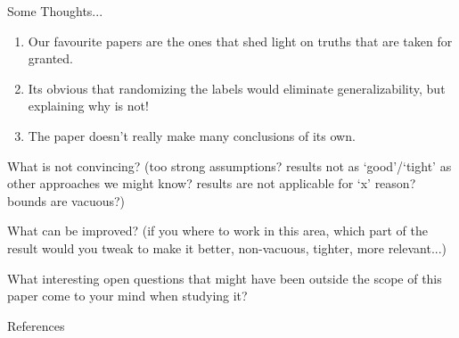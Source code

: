 \documentclass[10pt]{beamer}
\begin{document}
\begin{frame}{Some Thoughts... }
	\begin{enumerate}
		\item Our favourite papers are the ones that shed light on truths that are taken for granted.
		\item Its obvious that randomizing the labels would eliminate generalizability, but explaining why is not!
		\item The paper doesn't really make many conclusions of its own.
	\end{enumerate}
	
	What is not convincing? (too strong assumptions? results not as ‘good’/‘tight’ as other approaches we might know? results are not applicable for ‘x’ reason? bounds are vacuous?)
	
	What can be improved? (if you where to work in this area, which part of the result would you tweak to make it better, non-vacuous, tighter, more relevant...)
	
	What interesting open questions that might have been outside the scope of this paper come to your mind when studying it?
\end{frame}	

\begin{frame}{References}


\end{frame}	
	
\end{document}
